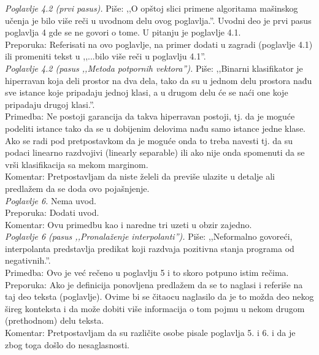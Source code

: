 \documentclass[a4paper]{report}
\begin{document}
\textit{Poglavlje 4.2 (prvi pasus).} Piše: ,,O opštoj slici primene algoritama mašinskog učenja je bilo više reči u uvodnom delu ovog poglavlja.''. Uvodni deo je prvi pasus poglavlja 4 gde se ne govori o tome. U pitanju je poglavlje 4.1. \\
\indent Preporuka: Referisati na ovo poglavlje, na primer dodati u zagradi (poglavlje 4.1) ili promeniti tekst u ,,...bilo više reči u poglavlju 4.1''. \\

\textit{Poglavlje 4.2 (pasus ,,Metoda potpornih vektora'').} Piše: ,,Binarni klasifikator je hiperravan koja deli prostor na dva dela, tako da su u jednom delu prostora nađu sve istance koje pripadaju jednoj klasi, a u drugom delu će se naći one koje pripadaju drugoj klasi.''. \\
\indent Primedba: Ne postoji garancija da takva hiperravan postoji, tj. da je moguće podeliti istance tako da se u dobijenim delovima nađu samo istance jedne klase. Ako se radi pod pretpostavkom da je moguće onda to treba navesti tj. da su podaci linearno razdvojivi (linearly separable) ili ako nije onda spomenuti da se vrši klasifikacija sa mekom marginom. \\
\indent Komentar: Pretpostavljam da niste želeli da previše ulazite u detalje ali predlažem da se doda ovo pojašnjenje. \\

\textit{Poglavlje 6.} Nema uvod. \\
\indent Preporuka: Dodati uvod. \\
\indent Komentar: Ovu primedbu kao i naredne tri uzeti u obzir zajedno. \\

\textit{Poglavlje 6 (pasus ,,Pronalaženje interpolanti'').} Piše: ,,Neformalno govoreći, interpolanta predstavlja predikat koji razdvaja pozitivna stanja programa od negativnih.''. \\
\indent Primedba: Ovo je već rečeno u poglavlju 5 i to skoro potpuno istim rečima. \\
\indent Preporuka: Ako je definicija ponovljena predlažem da se to naglasi i referiše na taj deo teksta (poglavlje). Ovime bi se čitaocu naglasilo da je to možda deo nekog šireg konteksta i da može dobiti više informacija o tom pojmu u nekom drugom (prethodnom) delu teksta. \\
\indent Komentar: Pretpostavljam da su različite osobe pisale poglavlja 5. i 6. i da je zbog toga došlo do nesaglasnosti. \\
\end{document}
